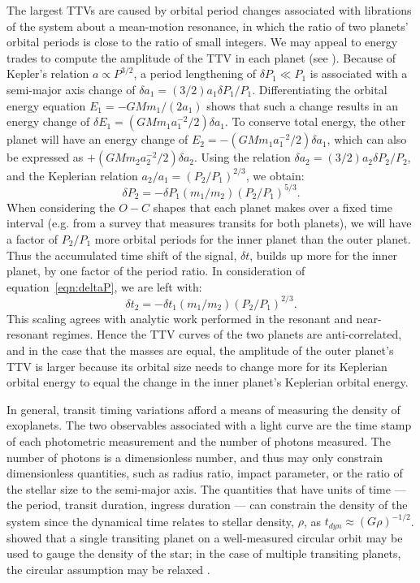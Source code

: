 \documentclass[graybox,natbib,nosecnum]{svmult}
\begin{document}
The largest TTVs are caused by orbital period changes associated with librations of the system about a mean-motion resonance, in which the ratio of two planets' orbital periods is close to the ratio of small integers.  We may appeal to energy trades to compute the amplitude of the TTV in each planet (see \citealt{2005MNRAS.359..567A,2010Sci...330...51H}).  Because of Kepler's relation $a \propto P^{3/2}$, a period lengthening of $\delta P_1 \ll P_1$ is associated with a semi-major axis change of $\delta a_1 = (3/2) a_1 \delta P_1 / P_1$.  Differentiating the orbital energy equation $E_1=-G M m_1 /(2a_1)$ shows that such a change results in an energy change of $\delta E_1=(GMm_1 a_1^{-2}/2) \delta a_1$.  To conserve total energy, the other planet will have an energy change of $E_2=-(GMm_1 a_1^{-2}/2) \delta a_1$, which can also be expressed as $+(GMm_2 a_2^{-2}/2)\delta a_2$.  Using the relation $\delta a_2 = (3/2) a_2 \delta P_2 / P_2$, and the Keplerian relation $a_2/a_1=(P_2/P_1)^{2/3}$, we obtain: 
\begin{equation}
\delta P_2 = -\delta P_1 (m_1/m_2) (P_2/P_1)^{5/3}. \label{eqn:deltaP}
\end{equation}
When considering the $O-C$ shapes that each planet makes over a fixed time interval (e.g. from a survey that measures transits for both planets), we will have a factor of $P_2/P_1$ more orbital periods for the inner planet than the outer planet.  Thus the accumulated time shift of the signal, $\delta t$, builds up more for the inner planet, by one factor of the period ratio. In consideration of equation~\ref{eqn:deltaP}, we are left with: 
\begin{equation}
\delta t_2 = -\delta t_1 (m_1/m_2) (P_2/P_1)^{2/3}. \label{eqn:deltat}
\end{equation}
This scaling agrees with analytic work performed in the resonant \citep{2016ApJ...823...72N} and near-resonant \citep{2012ApJ...761..122L,2016ApJ...828...44H} regimes. Hence the TTV curves of the two planets are anti-correlated, and in the case that the masses are equal, the amplitude of the outer planet's TTV is larger because its orbital size needs to change more for its Keplerian orbital energy to equal the change in the inner planet's Keplerian orbital energy. 

In general, transit timing variations afford a means of measuring the density of exoplanets.
The two observables associated with a light curve are the time stamp of each photometric
measurement and the number of photons measured.  The number of photons is a dimensionless
number, and thus may only constrain dimensionless quantities, such as radius ratio, impact 
parameter, or the ratio of the stellar size to the semi-major axis.  The quantities that 
have units of time --- the period, transit duration, ingress duration ---  can 
constrain the density of the system since the dynamical time relates to stellar density, $\rho$, as
$t_{dyn} \approx (G\rho)^{-1/2}$.  \citet{2003ApJ...585.1038S} showed that a single transiting planet
on a well-measured circular orbit may be used to gauge the density of the star;
in the case of multiple transiting planets, the circular assumption may be relaxed
\citep{2014MNRAS.440.2164K}.
\end{document}
